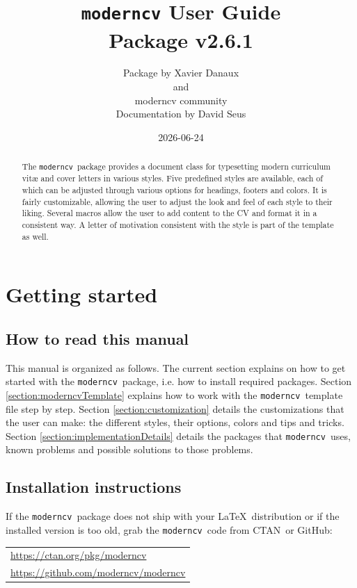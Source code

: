 \documentclass[a4paper, 11pt]{article}
\title{%
  \texttt{moderncv} User Guide\\
  {\small Package v2.6.1}%
}
\author{%
  Package by Xavier Danaux\\
  and\\
  moderncv community\\
  {\small Documentation by David Seus}%
}
\date{2026-06-24}
\newcommand{\code}[1]{\lstinline!#1!}
\newcommand{\moderncv}{\code{moderncv}}
\newcommand{\Moderncv}{\moderncv~}
\newcommand{\github}{GitHub}
\newcommand{\ctan}{CTAN}
\newcommand{\Ctan}{\ctan~}
\newcommand{\Latex}{\LaTeX~}
\newcommand{\moderncvGithub}{\url{https://github.com/moderncv/moderncv}}
\newcommand{\moderncvCtan}{\url{https://ctan.org/pkg/moderncv}}
\begin{document}
\maketitle
\begin{abstract}
  \noindent
  The \Moderncv package provides a document class for typesetting modern curriculum vit\ae{} and cover letters in various styles.
  Five predefined styles are available, each of which can be adjusted through various options for headings, footers and colors.
  It is fairly customizable, allowing the user to adjust the look and feel of each style to their liking.
  Several macros allow the user to add content to the CV and format it in a consistent way.
  A letter of motivation consistent with the style is part of the template as well.
\end{abstract}
\tableofcontents



\section{Getting started}
\subsection{How to read this manual}
This manual is organized as follows.
The current section explains on how to get started with the \Moderncv package, i.e. how to install required packages.
Section \ref{section:moderncvTemplate} explains how to work with the \Moderncv template file step by step.
Section \ref{section:customization} details the customizations that the user can make: the different styles, their options, colors and tips and tricks.
Section \ref{section:implementationDetails} details the packages that \Moderncv uses, known problems and possible solutions to those problems.

\subsection{Installation instructions}
If the \Moderncv package does not ship with your \Latex distribution or if the installed version is too old, grab the \Moderncv code from \Ctan or \github:

\begin{tabular}{l}
  \moderncvCtan \\%
  \moderncvGithub
\end{tabular}
\end{document}
